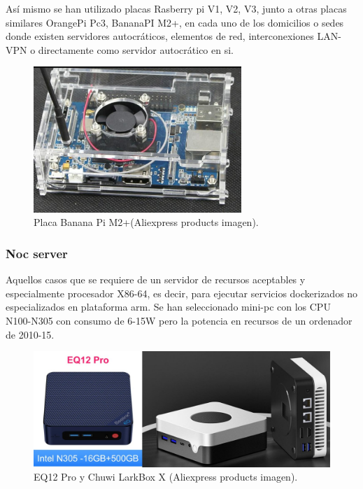 Así mismo se han utilizado placas Rasberry pi V1, V2, V3, junto a otras placas similares OrangePi Pc3, BananaPI M2+, en cada uno de los domicilios o sedes donde existen servidores autocráticos, elementos de red, interconexiones LAN-VPN o directamente como servidor autocrático en si.
\begin{figure}[!htbp]
\begin{center}
\includegraphics[width=0.7\textwidth]{./figuras/bananapi}
\caption{Placa Banana Pi M2+(Aliexpress products imagen).}
\label{F:bananapi}
\end{center}
\end{figure}

\subsubsection{Noc server}
Aquellos casos que se requiere de un servidor de recursos aceptables y especialmente procesador X86-64, es decir, para ejecutar servicios dockerizados no especializados en plataforma arm. Se han seleccionado mini-pc con los CPU N100-N305 con consumo de 6-15W pero la potencia en recursos de un ordenador de 2010-15.
\begin{figure}[!htbp]
\begin{center}
\includegraphics[width=1\textwidth]{./figuras/minipc}
\caption{EQ12 Pro y Chuwi LarkBox X (Aliexpress products imagen).}
\label{F:minipc}
\end{center}
\end{figure}

